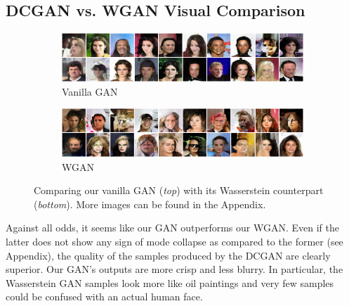 \documentclass[table]{article}
\begin{document}
\subsection{DCGAN vs. WGAN Visual Comparison}
\begin{figure}[ht]
  \centering
  \begin{subfigure}{\textwidth}
    \centering
    \includegraphics[scale=0.5]{imgs/gan_examples}
    \caption{Vanilla GAN}
  \end{subfigure}

  \vspace*{3mm}
  \begin{subfigure}{\textwidth}
    \centering
    \includegraphics[scale=0.5]{imgs/wgan_examples}
    \caption{WGAN}
  \end{subfigure}
  \caption{Comparing our vanilla GAN (\textit{top}) with its Wasserstein counterpart (\textit{bottom}). More images can be found in the Appendix.}
    \label{compare}
\end{figure}

Against all odds, it seems like our GAN outperforms our WGAN. Even if the latter does not show any sign of mode collapse as compared to the former (see Appendix), the quality of the samples produced by the DCGAN are clearly superior. Our GAN's outputs are more crisp and less blurry. In particular, the Wasserstein GAN samples look more like oil paintings and very few samples could be confused with an actual human face.
\end{document}
